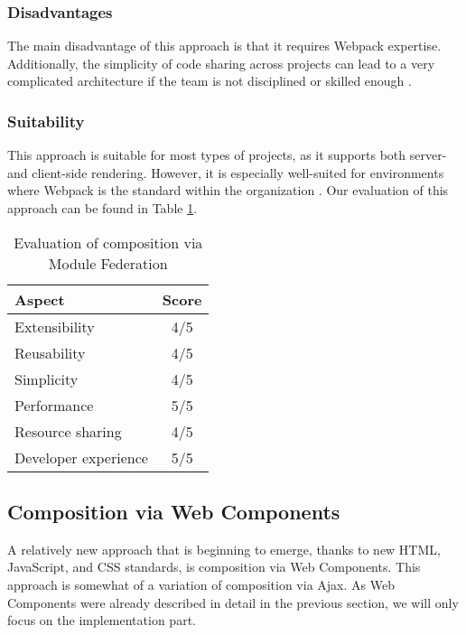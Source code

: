 \subsubsection{Disadvantages}
The main disadvantage of this approach is that it requires Webpack expertise. Additionally, the simplicity of code sharing across projects can lead to a very complicated architecture if the team is not disciplined or skilled enough \cite{MezzaliraBuildingMf}.

\subsubsection{Suitability}
This approach is suitable for most types of projects, as it supports both server- and client-side rendering. However, it is especially well-suited for environments where Webpack is the standard within the organization \cite{Taibi}. Our evaluation of this approach can be found in Table \ref{table:module-federation-evaluation}.  

\begin{table}[h]
  \centering
  \begin{tabular}{|p{4cm}|c|}
     \hline
        \textbf{Aspect} & \textbf{Score} \\
     \hline
        Extensibility & 4/5 \\
     \hline
        Reusability & 4/5 \\
     \hline
        Simplicity & 4/5 \\
     \hline
        Performance & 5/5 \\
     \hline
        Resource sharing & 4/5 \\
     \hline
        Developer experience & 5/5 \\
     \hline
  \end{tabular}
  \caption{Evaluation of composition via Module Federation}
  \label{table:module-federation-evaluation}
\end{table}


\subsection{Composition via Web Components}
A relatively new approach that is beginning to emerge, thanks to new HTML, JavaScript, and CSS standards, is composition via Web Components. This approach is somewhat of a variation of composition via Ajax. As Web Components were already described in detail in the previous section, we will only focus on the implementation part. \\

